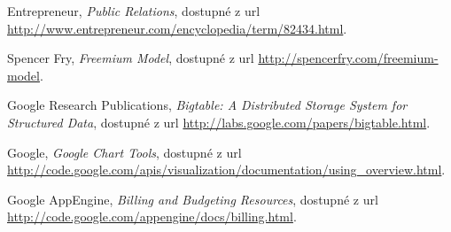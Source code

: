 \documentclass[bc,male,java,dept456]{diploma}						%
\begin{document}
\begin{thebibliography}{99}
 Entrepreneur,
\textit{Public Relations}, dostupné z url \url{http://www.entrepreneur.com/encyclopedia/term/82434.html}.

 Spencer Fry,
\textit{Freemium Model}, dostupné z url \url{http://spencerfry.com/freemium-model}.



 Google Research Publications,
\textit{Bigtable: A Distributed Storage System for Structured Data}, dostupné z url \url{http://labs.google.com/papers/bigtable.html}.


 Google,
\textit{Google Chart Tools}, dostupné z url \url{http://code.google.com/apis/visualization/documentation/using_overview.html}.

 Google AppEngine,
\textit{Billing and Budgeting Resources}, dostupné z url \url{http://code.google.com/appengine/docs/billing.html}.





\end{thebibliography}


\end{document}
